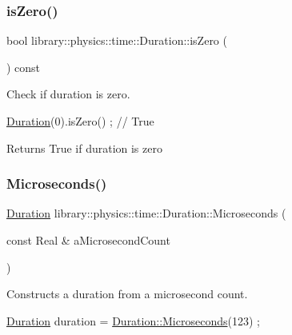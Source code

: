 \subsubsection{\texorpdfstring{is\+Zero()}{isZero()}}
{\footnotesize\ttfamily bool library\+::physics\+::time\+::\+Duration\+::is\+Zero (\begin{DoxyParamCaption}{ }\end{DoxyParamCaption}) const}



Check if duration is zero. 


\begin{DoxyCode}
\hyperlink{classlibrary_1_1physics_1_1time_1_1_duration_a0a70efcf487a841da572afcf00001f64}{Duration}(0).isZero() ; \textcolor{comment}{// True}
\end{DoxyCode}


\begin{DoxyReturn}{Returns}
True if duration is zero 
\end{DoxyReturn}
\mbox{\label{classlibrary_1_1physics_1_1time_1_1_duration_a9082d43579a99fd667b0080de8adf8ed}} 
\subsubsection{\texorpdfstring{Microseconds()}{Microseconds()}}
{\footnotesize\ttfamily \hyperlink{classlibrary_1_1physics_1_1time_1_1_duration}{Duration} library\+::physics\+::time\+::\+Duration\+::\+Microseconds (\begin{DoxyParamCaption}\item[{const Real \&}]{a\+Microsecond\+Count }\end{DoxyParamCaption})\hspace{0.3cm}{\ttfamily [static]}}



Constructs a duration from a microsecond count. 


\begin{DoxyCode}
\hyperlink{classlibrary_1_1physics_1_1time_1_1_duration_a0a70efcf487a841da572afcf00001f64}{Duration} duration = \hyperlink{classlibrary_1_1physics_1_1time_1_1_duration_a9082d43579a99fd667b0080de8adf8ed}{Duration::Microseconds}(123) ;
\end{DoxyCode}



